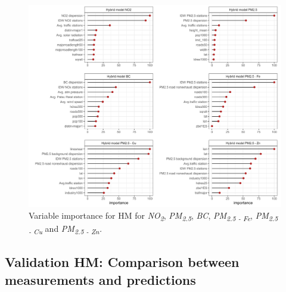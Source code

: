 \documentclass{article}
\begin{document}
\captionsetup[figure]{skip=6pt}
\begin{figure}[!htb]
\includegraphics[width=1.0\textwidth]{figures/fig_HM_allmodels_importance_v2.png}
\caption{Variable importance for HM for \textit{NO\textsubscript{2}}, \textit{PM\textsubscript{2.5}}, \textit{BC}, \textit{PM\textsubscript{2.5 - Fe}}, \textit{PM\textsubscript{2.5 - Cu}} and \textit{PM\textsubscript{2.5 - Zn}.}}
\label{fig2}
\end{figure}

\newpage

\subsection{Validation HM: Comparison between measurements and predictions}
\end{document}
